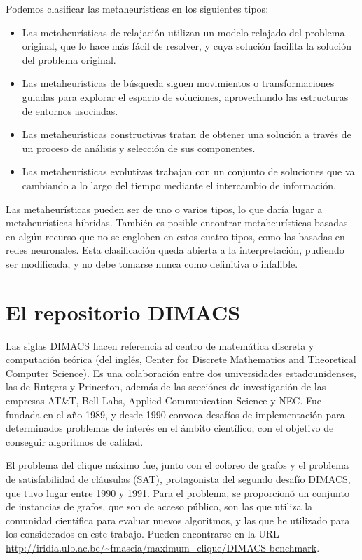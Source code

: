 Podemos clasificar las metaheurísticas en los siguientes tipos:
\begin{itemize}
  \item Las metaheurísticas de relajación utilizan un modelo relajado del problema
        original, que lo hace más fácil de resolver, y cuya solución facilita la
        solución del problema original.

  \item Las metaheurísticas de búsqueda siguen movimientos o transformaciones guiadas
        para explorar el espacio de soluciones, aprovechando las estructuras de
        entornos asociadas.

  \item Las metaheurísticas constructivas tratan de obtener una solución a través
        de un proceso de análisis y selección de sus componentes.

  \item Las metaheurísticas evolutivas trabajan con un conjunto de soluciones que
        va cambiando a lo largo del tiempo mediante el intercambio de información.
\end{itemize}

Las metaheurísticas pueden ser de uno o varios tipos, lo que daría lugar a metaheurísticas
híbridas. También es posible encontrar metaheurísticas basadas en algún recurso que
no se engloben en estos cuatro tipos, como las basadas en redes neuronales. Esta
clasificación queda abierta a la interpretación, pudiendo ser modificada, y no
debe tomarse nunca como definitiva o infalible.

\section{El repositorio DIMACS}
Las siglas DIMACS hacen referencia al centro de matemática discreta y computación
teórica (del inglés, Center for Discrete Mathematics and Theoretical Computer Science).
Es una colaboración entre dos universidades estadounidenses, las de Rutgers y Princeton,
además de las secciónes de investigación de las empresas AT\&T, Bell Labs, Applied
Communication Science y NEC. Fue fundada en el año 1989, y desde 1990 convoca desafíos
de implementación para determinados problemas de interés en el ámbito científico, con
el objetivo de conseguir algoritmos de calidad.

El problema del clique máximo fue, junto con el coloreo de grafos y el problema de satisfabilidad
de cláusulas (SAT), protagonista del segundo desafío DIMACS, que tuvo lugar entre 1990 y 1991.
Para el problema, se proporcionó un conjunto de instancias de grafos, que son de acceso público,
son las que utiliza la comunidad científica para evaluar nuevos algoritmos, y las que he utilizado
para los considerados en este trabajo. Pueden encontrarse en la URL
\url{http://iridia.ulb.ac.be/~fmascia/maximum_clique/DIMACS-benchmark}.

